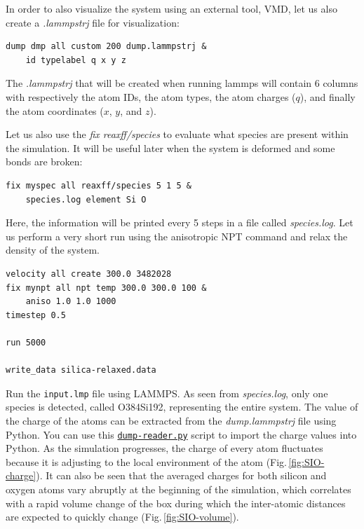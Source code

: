 \documentclass[9pt,tutorial]{livecoms}
\newcommand{\flecmd}[1]{\textcolor{command}{\texttt{#1}}} %
\newcommand{\dwlcmd}[1]{\textcolor{download}{\texttt{#1}}} %
\newcommand{\filepath}{https://raw.githubusercontent.com/lammpstutorials/lammpstutorials-article/main/files/}
\begin{document}
In order to also visualize the system using an external tool, VMD, let us also
create a \textit{.lammpstrj} file for visualization:
\begin{lstlisting}
dump dmp all custom 200 dump.lammpstrj &
    id typelabel q x y z
\end{lstlisting}
The \textit{.lammpstrj} that will be created when running lammps will contain
6 columns with respectively the atom IDs, the atom types, the atom charges ($q$),
and finally the atom coordinates ($x$, $y$, and $z$).

Let us also use the \textit{fix reaxff/species} to evaluate what species are
present within the simulation. It will be useful later when the system is deformed
and some bonds are broken:
\begin{lstlisting}
fix myspec all reaxff/species 5 1 5 &
    species.log element Si O
\end{lstlisting}
Here, the information will be printed every 5 steps in a file called \textit{species.log}.
Let us perform a very short run using the anisotropic NPT command and relax the
density of the system.
\begin{lstlisting}
velocity all create 300.0 3482028
fix mynpt all npt temp 300.0 300.0 100 &
    aniso 1.0 1.0 1000
timestep 0.5

run 5000

write_data silica-relaxed.data
\end{lstlisting}
Run the \flecmd{input.lmp} file using LAMMPS. As seen from \textit{species.log},
only one species is detected, called O384Si192, representing the entire system.
The value of the charge of the atoms can be extracted from the \textit{dump.lammpstrj}
file using Python. You can use this
\href{\filepath tutorial5/dump-reader.py}{\dwlcmd{dump-reader.py}}
script to import the charge values into Python.
As the simulation progresses, the charge of every atom fluctuates
because it is adjusting to the local environment of the atom (Fig.\,\ref{fig:SIO-charge}).
It can also be seen that the averaged charges for both silicon and oxygen
atoms vary abruptly at the beginning of the simulation, which correlates with
a rapid volume change of the box during which the inter-atomic distances are
expected to quickly change (Fig.\,\ref{fig:SIO-volume}).
\end{document}
